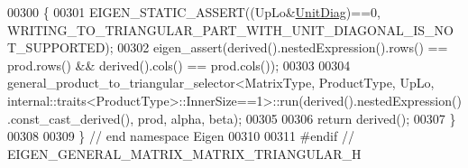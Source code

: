 \begin{DoxyCode}
00300 \{
00301   EIGEN\_STATIC\_ASSERT((UpLo&\hyperlink{group__enums_gga39e3366ff5554d731e7dc8bb642f83cdaddb72f888ac85d5a1c52333e54f9374b}{UnitDiag})==0, 
      WRITING\_TO\_TRIANGULAR\_PART\_WITH\_UNIT\_DIAGONAL\_IS\_NOT\_SUPPORTED);
00302   eigen\_assert(derived().nestedExpression().rows() == prod.rows() && derived().cols() == prod.cols());
00303   
00304   general\_product\_to\_triangular\_selector<MatrixType, ProductType, UpLo,
       internal::traits<ProductType>::InnerSize==1>::run(derived().nestedExpression().const\_cast\_derived(), prod, alpha, beta);
00305   
00306   \textcolor{keywordflow}{return} derived();
00307 \}
00308 
00309 \} \textcolor{comment}{// end namespace Eigen}
00310 
00311 \textcolor{preprocessor}{#endif // EIGEN\_GENERAL\_MATRIX\_MATRIX\_TRIANGULAR\_H}
\end{DoxyCode}
